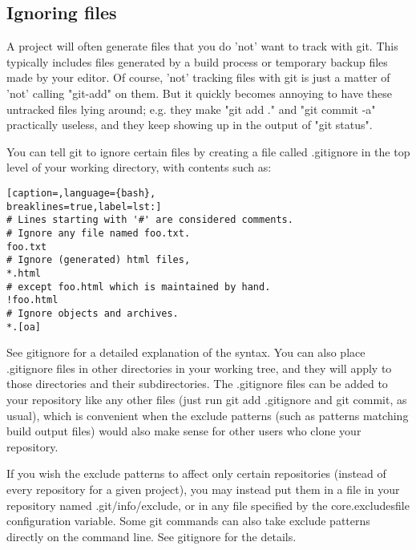 \subsection{Ignoring files}
A project will often generate files that you do 'not' want to track with git.
This typically includes files generated by a build process or temporary backup
files made by your editor. Of course, 'not' tracking files with git is just a
matter of 'not' calling "git-add" on them. But it quickly becomes annoying to
have these untracked files lying around; e.g. they make "git add ." and "git
commit -a" practically useless, and they keep showing up in the output of "git
status".

You can tell git to ignore certain files by creating a file called .gitignore
in the top level of your working directory, with contents such as:
\lstset{basicstyle=\scriptsize, numbers=none, captionpos=b, tabsize=4}
\begin{lstlisting}[caption=,language={bash},
breaklines=true,label=lst:]
# Lines starting with '#' are considered comments.
# Ignore any file named foo.txt.
foo.txt
# Ignore (generated) html files,
*.html
# except foo.html which is maintained by hand.
!foo.html
# Ignore objects and archives.
*.[oa]
\end{lstlisting}

See gitignore for a detailed explanation of the syntax. You can also place
.gitignore files in other directories in your working tree, and they will apply
to those directories and their subdirectories. The .gitignore files can be
added to your repository like any other files (just run git add .gitignore and
git commit, as usual), which is convenient when the exclude patterns (such as
patterns matching build output files) would also make sense for other users who
clone your repository.

If you wish the exclude patterns to affect only certain repositories (instead
of every repository for a given project), you may instead put them in a file in
your repository named .git/info/exclude, or in any file specified by the
core.excludesfile configuration variable. Some git commands can also take
exclude patterns directly on the command line. See gitignore for the details.
